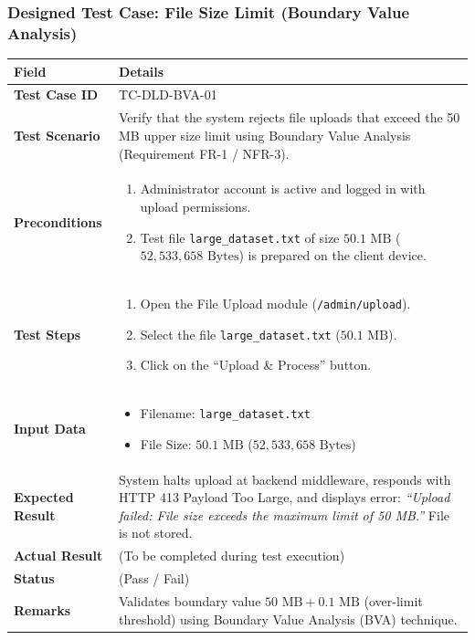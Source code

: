 \documentclass[11pt,a4paper]{article}
\begin{document}
\subsubsection*{Designed Test Case: File Size Limit (Boundary Value Analysis)}
\noindent
\begin{tabularx}{\textwidth}{|>{\bfseries}p{3.5cm}|X|}
\hline
Field & Details \\
\hline
Test Case ID & TC-DLD-BVA-01 \\
\hline
Test Scenario & Verify that the system rejects file uploads that exceed the 50 MB upper size limit using Boundary Value Analysis (Requirement FR-1 / NFR-3). \\
\hline
Preconditions & 
\begin{enumerate}[leftmargin=*,nosep]
    \item Administrator account is active and logged in with upload permissions.
    \item Test file \texttt{large\_dataset.txt} of size $50.1\text{ MB}$ ($52{,}533{,}658\text{ Bytes}$) is prepared on the client device.
\end{enumerate} \\
\hline
Test Steps & 
\begin{enumerate}[leftmargin=*,nosep]
    \item Open the File Upload module (\texttt{/admin/upload}).
    \item Select the file \texttt{large\_dataset.txt} ($50.1\text{ MB}$).
    \item Click on the ``Upload \& Process'' button.
\end{enumerate} \\
\hline
Input Data & 
\begin{itemize}[leftmargin=*,nosep]
    \item Filename: \texttt{large\_dataset.txt}
    \item File Size: $50.1\text{ MB}$ ($52{,}533{,}658\text{ Bytes}$)
\end{itemize} \\
\hline
Expected Result & System halts upload at backend middleware, responds with HTTP 413 Payload Too Large, and displays error: \textit{``Upload failed: File size exceeds the maximum limit of 50 MB.''} File is not stored. \\
\hline
Actual Result & (To be completed during test execution) \\
\hline
Status & (Pass / Fail) \\
\hline
Remarks & Validates boundary value $50\text{ MB} + 0.1\text{ MB}$ (over-limit threshold) using Boundary Value Analysis (BVA) technique. \\
\hline
\end{tabularx}
\end{document}

